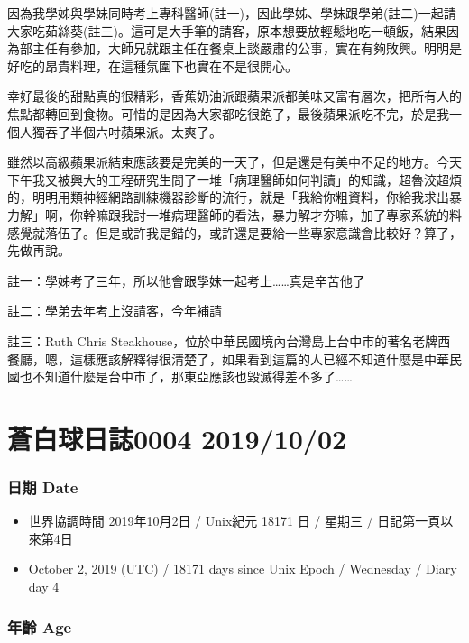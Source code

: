 \documentclass[a5paper, 12pt
]{book}
\providecommand{\tightlist}{%
  \setlength{\itemsep}{0pt}\setlength{\parskip}{0pt}}
\begin{document}
因為我學姊與學妹同時考上專科醫師(註一)，因此學姊、學妹跟學弟(註二)一起請大家吃茹絲葵(註三)。這可是大手筆的請客，原本想要放輕鬆地吃一頓飯，結果因為部主任有參加，大師兄就跟主任在餐桌上談嚴肅的公事，實在有夠敗興。明明是好吃的昂貴料理，在這種氛圍下也實在不是很開心。

幸好最後的甜點真的很精彩，香蕉奶油派跟蘋果派都美味又富有層次，把所有人的焦點都轉回到食物。可惜的是因為大家都吃很飽了，最後蘋果派吃不完，於是我一個人獨吞了半個六吋蘋果派。太爽了。

雖然以高級蘋果派結束應該要是完美的一天了，但是還是有美中不足的地方。今天下午我又被興大的工程研究生問了一堆「病理醫師如何判讀」的知識，超魯洨超煩的，明明用類神經網路訓練機器診斷的流行，就是「我給你粗資料，你給我求出暴力解」啊，你幹嘛跟我討一堆病理醫師的看法，暴力解才夯嘛，加了專家系統的料感覺就落伍了。但是或許我是錯的，或許還是要給一些專家意識會比較好？算了，先做再說。

註一：學姊考了三年，所以他會跟學妹一起考上\ldots\ldots 真是辛苦他了

註二：學弟去年考上沒請客，今年補請

註三：Ruth Chris
Steakhouse，位於中華民國境內台灣島上台中市的著名老牌西餐廳，嗯，這樣應該解釋得很清楚了，如果看到這篇的人已經不知道什麼是中華民國也不知道什麼是台中市了，那東亞應該也毀滅得差不多了\ldots\ldots{}

\hypertarget{ux84bcux767dux7403ux65e5ux8a8c0004-20191002}{%
\section{蒼白球日誌0004
2019/10/02}\label{ux84bcux767dux7403ux65e5ux8a8c0004-20191002}}

\hypertarget{ux65e5ux671f-date-3}{%
\subsubsection{日期 Date}\label{ux65e5ux671f-date-3}}

\begin{itemize}
\tightlist
\item
  世界協調時間 2019年10月2日 / Unix紀元 18171 日 / 星期三 /
  日記第一頁以來第4日
\item
  October 2, 2019 (UTC) / 18171 days since Unix Epoch / Wednesday /
  Diary day 4
\end{itemize}

\hypertarget{ux5e74ux9f61-age-3}{%
\subsubsection{年齡 Age}\label{ux5e74ux9f61-age-3}}
\end{document}

